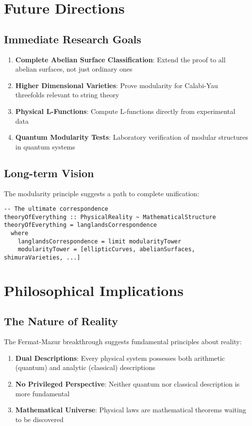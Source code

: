 \documentclass[12pt,a4paper]{article}
\begin{document}
\section{Future Directions}

\subsection{Immediate Research Goals}

\begin{enumerate}
\item \textbf{Complete Abelian Surface Classification}: Extend the proof to all abelian surfaces, not just ordinary ones
\item \textbf{Higher Dimensional Varieties}: Prove modularity for Calabi-Yau threefolds relevant to string theory
\item \textbf{Physical L-Functions}: Compute L-functions directly from experimental data
\item \textbf{Quantum Modularity Tests}: Laboratory verification of modular structures in quantum systems
\end{enumerate}

\subsection{Long-term Vision}

The modularity principle suggests a path to complete unification:

\begin{lstlisting}[style=haskell]
-- The ultimate correspondence
theoryOfEverything :: PhysicalReality ~ MathematicalStructure
theoryOfEverything = langlandsCorrespondence
  where
    langlandsCorrespondence = limit modularityTower
    modularityTower = [ellipticCurves, abelianSurfaces, shimuraVarieties, ...]
\end{lstlisting}

\section{Philosophical Implications}

\subsection{The Nature of Reality}

The Fermat-Mazur breakthrough suggests fundamental principles about reality:

\begin{enumerate}
\item \textbf{Dual Descriptions}: Every physical system possesses both arithmetic (quantum) and analytic (classical) descriptions
\item \textbf{No Privileged Perspective}: Neither quantum nor classical description is more fundamental
\item \textbf{Mathematical Universe}: Physical laws are mathematical theorems waiting to be discovered
\end{enumerate}
\end{document}
